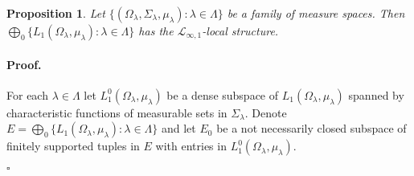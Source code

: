 \documentclass[12pt]{article}
\newtheorem{proposition}[theorem]{Proposition}
\renewenvironment{proof}{\paragraph{Proof.}}{\hfill$\square$\medskip}
\begin{document}
\begin{proposition}\label{C0SumOfL1SpHaveDPP} Let $\{(\Omega_\lambda,\Sigma_\lambda,\mu_\lambda):\lambda\in\Lambda\}$ be a family of measure spaces. Then $\bigoplus_0\{L_1(\Omega_\lambda,\mu_\lambda):\lambda\in\Lambda\}$ has the $\mathcal{L}_{\infty,1}$-local structure.
\end{proposition}
\begin{proof} 
For each $\lambda\in\Lambda$ let $L_1^0(\Omega_\lambda,\mu_\lambda)$ be a dense subspace of $L_1(\Omega_\lambda,\mu_\lambda)$ spanned by characteristic functions of measurable sets in $\Sigma_\lambda$.  Denote $E=\bigoplus_0\{L_1(\Omega_\lambda,\mu_\lambda):\lambda\in\Lambda\}$ and let $E_0$ be a not necessarily closed subspace of finitely supported tuples in $E$ with entries in $L_1^0(\Omega_\lambda,\mu_\lambda)$.


\end{proof}
\end{document}
